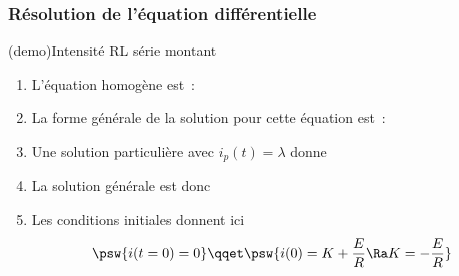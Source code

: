\documentclass[../../main/main.tex]{subfiles}
\begin{document}
\subsubsection{Résolution de l'équation différentielle}
\begin{tcb*}[label=demo:rlsolu, breakable](demo){Intensité RL série montant}
	\begin{enumerate}[label=\sqenumi]
		\item L'équation homogène est~:
		      \psw{%
			      \[
				      \dv{i_h}{t} + \frac{1}{\tau}i_h = 0
			      \]
		      }%
		      \vspace{-15pt}
		\item La forme générale de la solution pour cette équation est~:
		      \psw{%
			      \[
				      i_h(t) = K\exp\left( -\frac{t}{\tau} \right)
			      \]
		      }%
		      \vspace{-15pt}
		\item Une solution particulière avec $i_p(t) = \lambda$ donne
		\item La solution générale est donc
		      \psw{%
			      \[
				      i(t) = \frac{E}{R} + K\exp \left( - \frac{t}{\tau} \right)
			      \]
		      }%
		      \vspace{-15pt}
		\item Les conditions initiales donnent ici
		      \[
			      \psw{i(t=0) = 0}
			      \qqet
			      \psw{i(0) = K + \frac{E}{R} \Ra K=-\frac{E}{R}}
		      \]
	\end{enumerate}
\end{tcb*}
\end{document}
